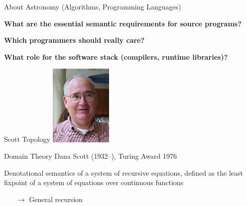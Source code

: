 \documentclass[xcolor=dvipsnames,9pt,mathserif]{beamer}
\renewcommand{\emph}[1]{\alert{#1}}
\begin{document}
\begin{frame}[c]{About Astronomy (Algorithms, Programming Languages)}

  {\large \textbf{What are the essential semantic requirements for source programs?}}

  \bigskip
  {\large \textbf{Which programmers should really care?}}

  \bigskip
  {\large \textbf{What role for the software stack (compilers, runtime libraries)?}}
\end{frame}

\begin{frame}{Scott Topology}
  \hfill\includegraphics[width=3cm]{scott.jpg}
  
  \begin{block}{Domain Theory}
    Dana Scott (1932--), Turing Award 1976

    \medskip    
    Denotational semantics of a system of recursive equations, defined
    as the least fixpoint of a system of equations over
    \emph{continuous} functions
  \end{block}
    
  \vfill
  \begin{itemize}
  \item[$\to$] General recursion
  \end{itemize}
\end{frame}  
\end{document}
